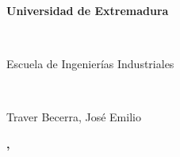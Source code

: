
\begin{titlepage}
\begin{center}
\begin{LARGE}
\textbf{Universidad de Extremadura} \\
\end{LARGE}
\ \\
\begin{Large}
Escuela de Ingenierías Industriales\\
\end{Large}
\ \\
\begin{large}
\Asignatura
\end{large}
\end{center}
\vspace{6cm}
\begin{flushright}
\begin{large}
\textbf{\myTitle}
\end{large}
\end{flushright}
\vspace{10cm}
\begin{center}
Traver Becerra, José Emilio \\
\Degree
\end{center}
	\begin{center}
		\textbf{\myLocation, \myTime}
	\end{center}
\end{titlepage}


